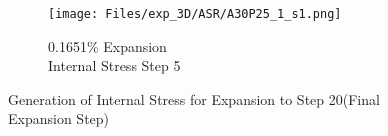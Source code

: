 
\begin{figure}[ht!]
\centering
    \begin{subfigure}{.25\textwidth}
      \centering
      \texttt{[image: Files/exp\_3D/ASR/A30P25\_1\_s1.png]}
      \caption{0.1651\% Expansion\\Internal Stress Step 5}
    \end{subfigure}%

\caption{Generation of Internal Stress for Expansion to Step 20(Final Expansion Step)}
\label{fig:A30P25_stress}
\end{figure}